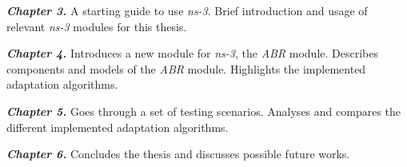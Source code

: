 \textbf{\textit{Chapter 3.}} A starting guide to use \textit{ns-3}. Brief introduction and usage of 
relevant \textit{ns-3} modules for this thesis.

\textbf{\textit{Chapter 4.}} Introduces a new module for \textit{ns-3}, the \textit{ABR} module. Describes components 
and models of the \textit{ABR} module. Highlights the implemented adaptation algorithms.

\textbf{\textit{Chapter 5.}} Goes through a set of testing scenarios. Analyses and compares the different implemented adaptation algorithms.

\textbf{\textit{Chapter 6.}} Concludes the thesis and discusses possible future works.
